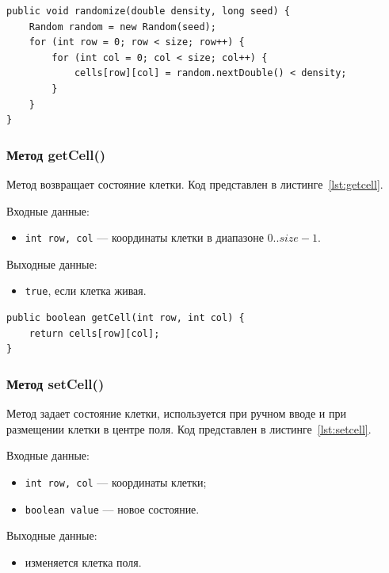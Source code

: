 \begin{lstlisting}[caption={Метод randomize()}, label={lst:random}]
public void randomize(double density, long seed) {
	Random random = new Random(seed);
	for (int row = 0; row < size; row++) {
		for (int col = 0; col < size; col++) {
			cells[row][col] = random.nextDouble() < density;
		}
	}
}
\end{lstlisting}

\subsubsection*{Метод getCell()}

Метод возвращает состояние клетки. Код представлен в листинге~\ref{lst:getcell}.

Входные данные:
\begin{itemize}
	\item \texttt{int row, col} --- координаты клетки в диапазоне $0..size-1$.
\end{itemize}

Выходные данные:
\begin{itemize}
	\item \texttt{true}, если клетка живая.
\end{itemize}

\begin{lstlisting}[caption={Метод getCell()}, label={lst:getcell}]
public boolean getCell(int row, int col) {
	return cells[row][col];
}
\end{lstlisting}

\subsubsection*{Метод setCell()}

Метод задает состояние клетки, используется при ручном вводе и при размещении клетки в центре поля. Код представлен в листинге~\ref{lst:setcell}.

Входные данные:
\begin{itemize}
	\item \texttt{int row, col} --- координаты клетки;
	\item \texttt{boolean value} --- новое состояние.
\end{itemize}

Выходные данные:
\begin{itemize}
	\item изменяется клетка поля.
\end{itemize}

